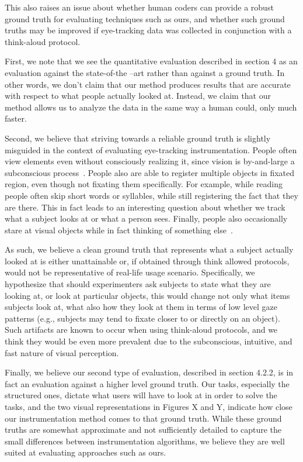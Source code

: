 This also raises an issue about whether human coders can provide a robust ground truth for evaluating techniques such as ours, and whether such ground truths may be improved if eye-tracking data was collected in conjunction with a think-aloud protocol. 


First, we note that we see the quantitative evaluation described in section 4 as an evaluation against the state-of-the –art rather than against a ground truth. In other words, we don't claim that our method produces results that are accurate with respect to what people actually looked at. Instead, we claim that our method allows us to analyze the data in the same way a human could, only much faster. 

Second, we believe that striving towards a reliable ground truth is slightly misguided in the context of evaluating eye-tracking instrumentation.  People often view elements even without consciously realizing it, since vision is by-and-large a subconscious process~\cite{duchowski2007eye}. People also are able to register multiple objects in fixated region, even though not fixating them specifically. For example, while reading people often skip short words or syllables, while still registering the fact that they are there. This in fact leads to an interesting question about whether we track what a subject looks at or what a person sees. Finally, people also occasionally stare at visual objects while in fact thinking of something else~\cite{duchowski2007eye}. 


As such, we believe a clean ground truth that represents what a subject actually looked at is either unattainable or, if obtained through think allowed protocols, would not be representative of real-life usage scenario. Specifically, we hypothesize that should experimenters ask subjects to state what they are looking at, or look at particular objects, this would change not only what items subjects look at, what also how they look at them in terms of low level gaze patterns (e.g., subjects may tend to fixate closer to or directly on an object). Such artifacts are known to occur when using think-aloud protocols, and we think they would be even more prevalent due to the subconscious, intuitive, and fast nature of visual perception.   

Finally, we believe our second type of evaluation, described in section 4.2.2, is in fact an evaluation against a higher level ground truth. Our tasks, especially the structured ones, dictate what users will have to look at in order to solve the tasks, and the two visual representations in Figures X and Y, indicate how close our instrumentation method comes to that ground truth. While these ground truths are somewhat approximate and not sufficiently detailed to capture the small differences between instrumentation algorithms, we believe they are well suited at evaluating approaches such as ours.   
